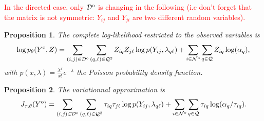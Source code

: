 \documentclass[10pt]{article}
\newcommand{\1}{\mathds{1}}
\newcommand{\MA}{Y}
\newcommand{\MAO}{\MA^\text{\rm o}}
\newcommand{\block}{\mathcal{Q}}
\newcommand{\dyad}{\mathcal{D}}
\newcommand{\dyadO}{\dyad^\text{\rm o}}
\newcommand{\node}{\mathcal{N}}
\newcommand{\nodeO}{\node^\text{\rm o}}
\newtheorem{proposition}{Proposition}
\begin{document}
% 


\textcolor{red}{In the directed case, only $\dyadO$ is changing in the following (i.e don't forget that the matrix is not symmetric: $\MA_{ij}$
and $\MA_{ji}$ are two different random variables).}
\begin{proposition}\label{prop:complete_loglik_sbm}      The      complete
  log-likelihood restricted to the observed variables is
  \begin{equation}
    \nonumber
    \log  p_{\theta}(\MAO,Z)=  \sum_{(i,j)\in  \dyadO}  \sum_{(q,\ell)
      \in\block^2}   Z_{iq}Z_{j\ell}\log   p(\MA_{ij},\lambda_{q\ell})   +
    \sum_{i\in \nodeO}\sum_{q\in\block} Z_{iq}\log (\alpha_{q}),
  \end{equation}
  with $p(x,\lambda)= \frac{\lambda^{x}}{x!}e^{-\lambda}$ the Poisson probability density function.
\end{proposition}

\begin{proposition} 
The variationnal approximation is
\begin{equation*}
  \label{eq:J_MAR}
  J_{\tau,\theta}(\MAO) =  \sum_{(i,j)\in  \dyadO}  \sum_{(q,\ell)\in\block^2}  \tau_{iq}\tau
  _{j\ell}\log       p(\MA_{ij},\lambda_{q\ell})      +       \sum_{i\in\nodeO}\sum_{q\in\block} \tau _{iq}\log (\alpha_{q}/\tau_{iq}).
\end{equation*}
\end{proposition}
\end{document}
